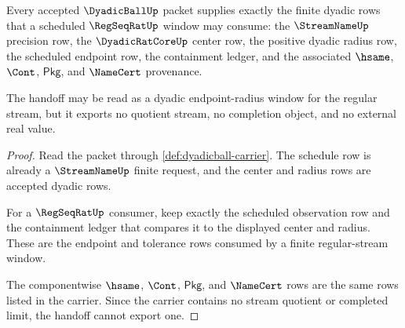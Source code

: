 \begin{theorem}
\label{thm:dyadicball-regseqrat-window-handoff}
Every accepted $\DyadicBallUp$ packet supplies exactly the finite dyadic rows
that a scheduled $\RegSeqRatUp$ window may consume: the $\StreamNameUp$
precision row, the $\DyadicRatCoreUp$ center row, the positive dyadic radius
row, the scheduled endpoint row, the containment ledger, and the associated
$\hsame$, $\Cont$, $\mathsf{Pkg}$, and $\NameCert$ provenance.

The handoff may be read as a dyadic endpoint-radius window for the regular
stream, but it exports no quotient stream, no completion object, and no
external real value.
\end{theorem}
\begin{proof}
Read the packet through \autoref{def:dyadicball-carrier}. The schedule row is
already a $\StreamNameUp$ finite request, and the center and radius rows are
accepted dyadic rows.

For a $\RegSeqRatUp$ consumer, keep exactly the scheduled observation row and
the containment ledger that compares it to the displayed center and radius.
These are the endpoint and tolerance rows consumed by a finite regular-stream
window.

The componentwise $\hsame$, $\Cont$, $\mathsf{Pkg}$, and $\NameCert$ rows are
the same rows listed in the carrier. Since the carrier contains no stream
quotient or completed limit, the handoff cannot export one.
\end{proof}

